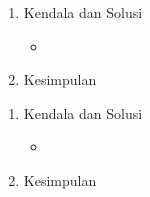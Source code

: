\begin{enumerate}
\item Kendala dan Solusi

\begin{itemize}
\item
\end{itemize}


\item Kesimpulan

\end{enumerate}

\begin{enumerate}
\item Kendala dan Solusi

\begin{itemize}
\item
\end{itemize}


\item Kesimpulan

\end{enumerate}
	